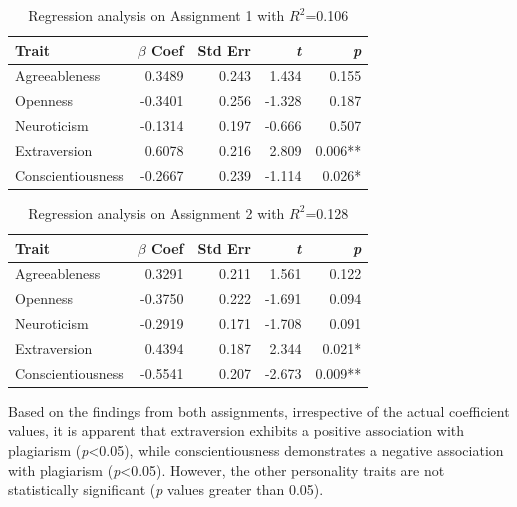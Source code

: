 \begin{table}[H]
  \centering
  \caption{Regression analysis on Assignment 1 with $R^2$=0.106\\\label{tab:assign1Regression}}
    \vspace{-12pt}
  \begin{tabular}{p{2.5cm}rrrr}
    \toprule
    Trait & $\beta$ Coef & Std Err & \textit{t} & \textit{p}\\\midrule
    Agreeableness & 0.3489 & 0.243 & 1.434 & 0.155 \\
    Openness & -0.3401 & 0.256 & -1.328 & 0.187 \\
    Neuroticism & -0.1314 & 0.197 & -0.666 & 0.507 \\
    Extraversion & 0.6078 & 0.216 & 2.809 & 0.006** \\
    Conscientiousness & -0.2667 & 0.239 & -1.114 & 0.026* \\\bottomrule
  \end{tabular}\vspace{-12pt}
\end{table}

\begin{table}[H]
  \centering
  \caption{Regression analysis on Assignment 2 with $R^2$=0.128\\\label{tab:assign2Regression}}
    \vspace{-12pt}
  \begin{tabular}{p{2.5cm}rrrr}
    \toprule
    Trait & $\beta$ Coef & Std Err & \textit{t} & \textit{p}\\\midrule
    Agreeableness & 0.3291 & 0.211 & 1.561 & 0.122 \\
    Openness & -0.3750 & 0.222 & -1.691 & 0.094\\
    Neuroticism & -0.2919 & 0.171 & -1.708 &  0.091\\
    Extraversion & 0.4394 & 0.187 & 2.344 & 0.021*\\
    Conscientiousness & -0.5541 & 0.207 & -2.673 & 0.009**\\\bottomrule
  \end{tabular}\vspace{-8pt}
\end{table}

Based on the findings from both assignments, irrespective of the actual coefficient values, it is apparent that extraversion exhibits a positive association with plagiarism (\textit{p}<0.05), while conscientiousness demonstrates a negative association with plagiarism (\textit{p}<0.05). However, the other personality traits are not statistically significant (\textit{p} values greater than 0.05).

